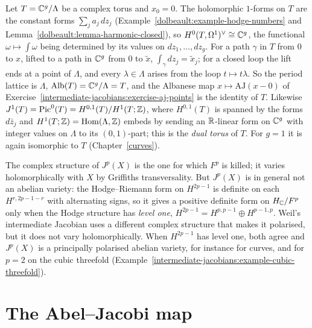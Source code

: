 \begin{example}\label{intermediate-jacobians:example-albanese-torus}
Let $T = \mathbb{C}^g/\Lambda$ be a complex torus and $x_0 = 0$. The holomorphic $1$-forms on $T$ are the constant forms $\sum_ja_j\,dz_j$ (Example~\ref{dolbeault:example-hodge-numbers} and
Lemma~\ref{dolbeault:lemma-harmonic-closed}), so $H^0(T, \Omega^1)^\vee \cong \mathbb{C}^g$, the functional $\omega \mapsto \int\omega$ being determined by its values on $dz_1, \ldots, dz_g$. For a path $\gamma$ in $T$
from $0$ to $x$, lifted to a path in $\mathbb{C}^g$ from $0$ to $\tilde x$, $\int_\gamma dz_j = \tilde x_j$; for a closed loop the lift ends at a point of $\Lambda$, and every $\lambda \in \Lambda$ arises from the loop
$t \mapsto t\lambda$. So the period lattice is $\Lambda$, $\mathrm{Alb}(T) = \mathbb{C}^g/\Lambda = T$, and the Albanese map $x \mapsto \mathrm{AJ}(x - 0)$ of Exercise~\ref{intermediate-jacobians:exercise-aj-points}
is the identity of $T$. Likewise $J^1(T) = \operatorname{Pic}^0(T) = H^{0,1}(T)/H^1(T; \mathbb{Z})$, where $H^{0,1}(T)$ is spanned by the forms $d\bar z_j$ and $H^1(T; \mathbb{Z}) = \operatorname{Hom}(\Lambda, \mathbb{Z})$ embeds by sending an $\mathbb{R}$-linear form on $\mathbb{C}^g$
with integer values on $\Lambda$ to its $(0,1)$-part; this is the \emph{dual torus} of $T$. For $g = 1$ it is again isomorphic to $T$ (Chapter~\ref{curves}).
\end{example}

\begin{remark}\label{intermediate-jacobians:remark-not-abelian}
The complex structure of $J^p(X)$ is the one for which $F^p$ is killed; it varies holomorphically with $X$ by Griffiths transversality. But $J^p(X)$ is in general not an abelian variety:
the Hodge--Riemann form on $H^{2p-1}$ is definite on each $H^{r,2p-1-r}$ with alternating signs, so it gives a positive definite form on $H_{\mathbb{C}}/F^p$ only when the Hodge structure has
\emph{level one}, $H^{2p-1} = H^{p,p-1} \oplus H^{p-1,p}$. Weil's intermediate Jacobian uses a different complex structure that makes it polarised, but it does not vary holomorphically. When
$H^{2p-1}$ has level one, both agree and $J^p(X)$ is a principally polarised abelian variety, for instance for curves, and for $p = 2$ on the cubic threefold
(Example~\ref{intermediate-jacobians:example-cubic-threefold}).
\end{remark}

\section{The Abel--Jacobi map}\label{intermediate-jacobians:section-abel-jacobi}

